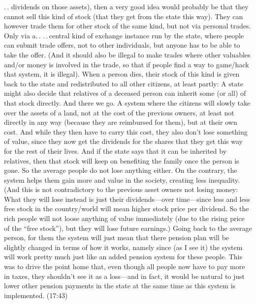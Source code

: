 \documentclass{report}
\begin{document}
.\,. dividends on those assets), then a very good idea would probably be that they cannot sell this kind of stock (that they get from the state this way). They can however trade them for other stock of the same kind, but not via personal trades. Only via a.\,. .\,.\,central kind of exchange instance run by the state, where people can submit trade offers, not to other individuals, but anyone has to be able to take the offer. (And it should also be illegal to make trades where other valuables and/or money is involved in the trade, so that if people find a way to game/hack that system, it is illegal). When a person dies, their stock of this kind is given back to the state and redistributed to all other citizens, at least partly: A state might also decide that relatives of a deceased person can inherit some (or all) of that stock directly. And there we go. A system where the citizens will slowly take over the assets of a land, not at the cost of the previous owners, at least not directly in any way (because they are reimbursed for them), but at their own cost. And while they then have to carry this cost, they also don't lose something of value, since they now get the dividends for the shares that they get this way for the rest of their lives. And if the state says that it can be inherited by relatives, then that stock will keep on benefiting the family once the person is gone. So the average people do not lose anything either. On the contrary, the system helps them gain more and value in the society, creating less inequality. (And this is not contradictory to the previous asset owners not losing money: What they will lose instead is just their dividends---over time---since less and less free stock in the country/world will mean higher stock price per dividend. So the rich people will not loose anything of value immediately (due to the rising price of the ``free stock''), but they will lose future earnings.) %
Going back to the average person, for them the system will just mean that there pension plan will be slightly changed in terms of how it works, namely since (as I see it) the system will work pretty much just like an added pension system for these people. This was to drive the point home that, even though all people now have to pay more in taxes, they shouldn't see it as a loss---and in fact, it would be natural to just lower other pension payments in the state at the same time as this system is implemented. (17:43)
\end{document}
